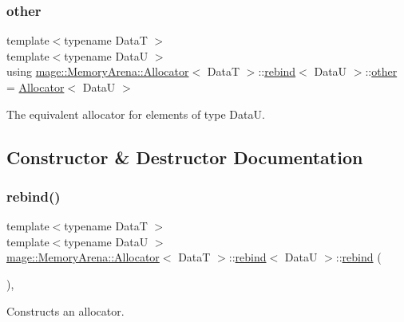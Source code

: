 \subsubsection{\texorpdfstring{other}{other}}
{\footnotesize\ttfamily template$<$typename DataT $>$ \\
template$<$typename DataU $>$ \\
using \hyperlink{structmage_1_1_memory_arena_1_1_allocator}{mage\+::\+Memory\+Arena\+::\+Allocator}$<$ DataT $>$\+::\hyperlink{structmage_1_1_memory_arena_1_1_allocator_1_1rebind}{rebind}$<$ DataU $>$\+::\hyperlink{structmage_1_1_memory_arena_1_1_allocator_1_1rebind_aad55bf384b9a95ae1c2158f1d2afe180}{other} =  \hyperlink{structmage_1_1_memory_arena_1_1_allocator}{Allocator}$<$ DataU $>$}

The equivalent allocator for elements of type {\ttfamily DataU}. 

\subsection{Constructor \& Destructor Documentation}
\hypertarget{structmage_1_1_memory_arena_1_1_allocator_1_1rebind_accff2c1aafa45e3c5cc9f5d66b4a3bb5}{}\label{structmage_1_1_memory_arena_1_1_allocator_1_1rebind_accff2c1aafa45e3c5cc9f5d66b4a3bb5} 
\subsubsection{\texorpdfstring{rebind()}{rebind()}\hspace{0.1cm}{\footnotesize\ttfamily [1/3]}}
{\footnotesize\ttfamily template$<$typename DataT $>$ \\
template$<$typename DataU $>$ \\
\hyperlink{structmage_1_1_memory_arena_1_1_allocator}{mage\+::\+Memory\+Arena\+::\+Allocator}$<$ DataT $>$\+::\hyperlink{structmage_1_1_memory_arena_1_1_allocator_1_1rebind}{rebind}$<$ DataU $>$\+::\hyperlink{structmage_1_1_memory_arena_1_1_allocator_1_1rebind}{rebind} (\begin{DoxyParamCaption}{ }\end{DoxyParamCaption})\hspace{0.3cm}{\ttfamily [private]}, {\ttfamily [delete]}}

Constructs an allocator. \hypertarget{structmage_1_1_memory_arena_1_1_allocator_1_1rebind_ad77d68305f2e8f5ddd4080e6f992efec}{}\label{structmage_1_1_memory_arena_1_1_allocator_1_1rebind_ad77d68305f2e8f5ddd4080e6f992efec} 
